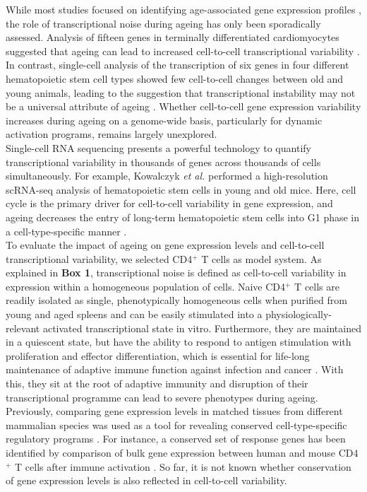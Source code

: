 While most studies focused on identifying age-associated gene expression profiles \citep{DeMagalhaes2009}, the role of transcriptional noise during ageing has only been sporadically assessed. Analysis of fifteen genes in terminally differentiated cardiomyocytes suggested that ageing can lead to increased cell-to-cell transcriptional variability \citep{Bahar2006}. In contrast, single-cell analysis of the transcription of six genes in four different hematopoietic stem cell types showed few cell-to-cell changes between old and young animals, leading to the suggestion that transcriptional instability may not be a universal attribute of ageing \citep{Warren2007}. Whether cell-to-cell gene expression variability increases during ageing on a genome-wide basis, particularly for dynamic activation programs, remains largely unexplored.\\

Single-cell RNA sequencing presents a powerful technology to quantify  transcriptional variability in thousands of genes across thousands of cells simultaneously. For example, Kowalczyk \textit{et al.} performed a high-resolution scRNA-seq analysis of hematopoietic stem cells in young and old mice. Here, cell cycle is the primary driver for cell-to-cell variability in gene expression, and ageing decreases the entry of long-term hematopoietic stem cells into G1 phase in a cell-type-specific manner \citep{Kowalczyk2015}.\\ 

To evaluate the impact of ageing on gene expression levels and cell-to-cell transcriptional variability, we selected CD4$^+$ T cells as model system. As explained in \textbf{Box 1}, transcriptional noise is defined as cell-to-cell variability in expression within a homogeneous population of cells. Naive CD4$^+$ T cells are readily isolated as single, phenotypically homogeneous cells when purified from young and aged spleens and can be easily stimulated into a physiologically-relevant activated transcriptional state in vitro. Furthermore, they are maintained in a quiescent state, but have the ability to respond to antigen stimulation with proliferation and effector differentiation, which is essential for life-long maintenance of adaptive immune function against infection and cancer \citep{Swain2012, Kim2014a}. With this, they sit at the root of adaptive immunity and disruption of their transcriptional programme can lead to severe phenotypes during ageing. \\

Previously, comparing gene expression levels in matched tissues from different mammalian species was used as a tool for revealing conserved cell-type-specific regulatory programs \citep{Sudmant2015, Finseth2014, Brawand2011, Flajnik2009}. For instance, a conserved set of response genes has been identified by comparison of bulk gene expression between human and mouse CD4$^+$ T cells after immune activation \citep{Shay2013}. So far, it is not known whether conservation of gene expression levels is also reflected in cell-to-cell variability.\\

